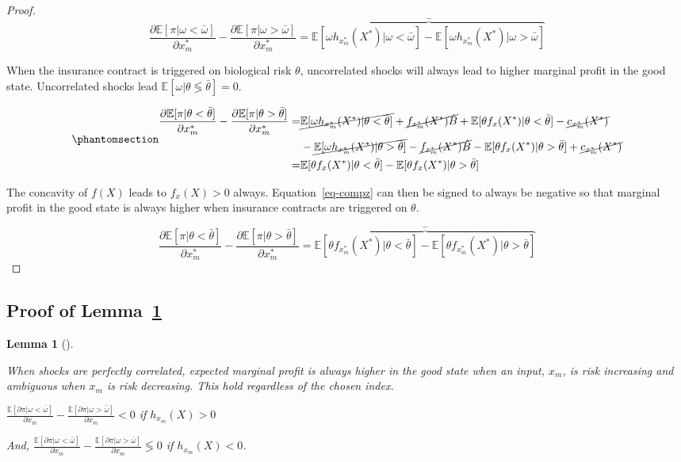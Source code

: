 \documentclass[
  letterpaper,
  DIV=11,
  numbers=noendperiod]{scrartcl}
\theoremstyle{plain}
\newtheorem{lemma}{Lemma}[section]
\theoremstyle{plain}
\theoremstyle{remark}
\begin{document}
\begin{proof}
\[
\frac{\partial \mathbb{E}[\pi|\omega<\bar\omega]}{\partial x^*_m}-\frac{\partial \mathbb{E}[\pi|\omega>\bar\omega]}{\partial x^*_m}=\overbrace{\mathbb{E}[\omega h_{x_m^*}(X^*)|\omega<\bar\omega]-\mathbb{E}[\omega h_{x_m^*}(X^*)|\omega>\bar\omega]}^{-}
\]

When the insurance contract is triggered on biological risk \(\theta\),
uncorrelated shocks will always lead to higher marginal profit in the
good state. Uncorrelated shocks lead
\(\mathbb{E}[\omega|\theta \lessgtr \bar \theta]=0\).

\begin{equation}\phantomsection\label{eq-compz}{
\begin{aligned}
\small
\frac{\partial \mathbb{E}[\pi|\theta<\bar\theta]}{\partial x^*_m}-\frac{\partial \mathbb{E}[\pi|\theta>\bar\theta]}{\partial x^*_m}=&\cancel{\mathbb{E}[\omega h_{x_m^*}(X^*)|\theta<\bar\theta]}+\cancel{f_{x_m^*}(X^*)\hat{B}}+\mathbb{E}[\theta f_x(X^*)|\theta <\bar\theta]-\cancel{c_{x^*_m}(X^*)} \\
&-\cancel{\mathbb{E}[\omega h_{x_m^*}(X^*)|\theta>\bar\theta]}-\cancel{f_{x_m^*}(X^*)\hat{B}}-\mathbb{E}[\theta f_x(X^*)|\theta >\bar\theta]+\cancel{c_{x^*_m}(X^*)}\\
=&\mathbb{E}[\theta f_x(X^*)|\theta <\bar\theta]-\mathbb{E}[\theta f_x(X^*)|\theta >\bar\theta]
\end{aligned}
}\end{equation}

The concavity of \(f(X)\) leads to \(f_x(X)>0\) always.
Equation~\ref{eq-compz} can then be signed to always be negative so that
marginal profit in the good state is always higher when insurance
contracts are triggered on \(\theta\).

\[
\frac{\partial \mathbb{E}[\pi|\theta<\bar\theta]}{\partial x^*_m}-\frac{\partial \mathbb{E}[\pi|\theta>\bar\theta]}{\partial x^*_m}=\overbrace{\mathbb{E}[\theta f_{x_m^*}(X^*)|\theta<\bar\theta]-\mathbb{E}[\theta f_{x_m^*}(X^*)|\theta>\bar\theta]}^{-}
\]
\end{proof}

\subsection{\texorpdfstring{Proof of
Lemma~\ref{lem-corr}}{Proof of Lemma~}}\label{proof-of-lem-corr}

\begin{lemma}[]\protect\hypertarget{lem-corr}{}\label{lem-corr}

When shocks are perfectly correlated, expected marginal profit is always
higher in the good state when an input, \(x_m\), is risk increasing and
ambiguous when \(x_m\) is risk decreasing. This hold regardless of the
chosen index.

\(\frac{\mathbb{E}[\partial \pi|\omega<\bar \omega]}{\partial x_m}-\frac{\mathbb{E}[\partial \pi|\omega>\bar \omega]}{\partial x_m}<0\)
if \(h_{x_m}(X)>0\)

And,
\(\frac{\mathbb{E}[\partial \pi|\omega<\bar \omega]}{\partial x_m}-\frac{\mathbb{E}[\partial \pi|\omega>\bar \omega]}{\partial x_m}\lessgtr 0\)
if \(h_{x_m}(X)<0\).

\end{lemma}
\end{document}
